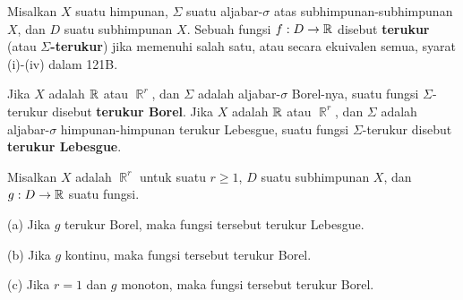  Misalkan $X$ suatu himpunan, $\Sigma$ suatu
aljabar-$\sigma$ atas subhimpunan-subhimpunan $X$, dan $D$ suatu
subhimpunan $X$. Sebuah fungsi $f:D\to\Bbb R$ disebut {\bf terukur}
(atau {\bf $\Sigma$-terukur}) jika memenuhi salah satu, atau secara
ekuivalen semua, syarat (i)-(iv) dalam 121B.

Jika $X$ adalah $\Bbb R$ atau $\BbbR^r$, dan $\Sigma$ adalah
aljabar-$\sigma$ Borel-nya, suatu fungsi $\Sigma$-terukur
disebut {\bf terukur Borel}. Jika $X$ adalah $\Bbb R$ atau $\BbbR^r$,
dan $\Sigma$ adalah aljabar-$\sigma$ himpunan-himpunan terukur
Lebesgue, suatu fungsi $\Sigma$-terukur disebut
{\bf terukur Lebesgue}.


 Misalkan $X$ adalah $\BbbR^r$ untuk suatu
$r\ge 1$, $D$ suatu subhimpunan $X$, dan $g:D\to\Bbb R$ suatu fungsi.

(a) Jika $g$ terukur Borel, maka fungsi tersebut terukur Lebesgue.

(b) Jika $g$ kontinu, maka fungsi tersebut terukur Borel.

(c) Jika $r=1$ dan $g$ monoton, maka fungsi tersebut terukur Borel.

